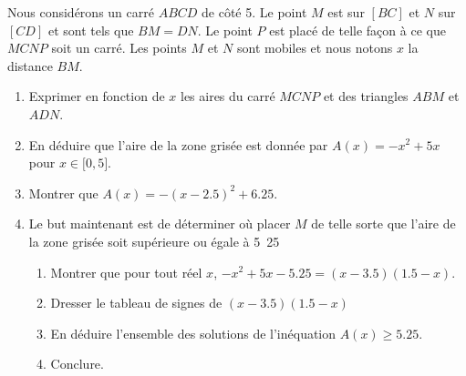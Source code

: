 
\begin{exercice}\label{exosmath-0654}

%   


    Nous considérons un carré \( ABCD\) de côté \unit{5}{\centi\meter}. Le point \( M\) est sur \( [BC]\) et \( N\) sur \( [CD]\) et sont tels que \( BM=DN\). Le point \( P\) est placé de telle façon à ce que \( MCNP\) soit un carré. Les points \( M\) et \( N\) sont mobiles et nous notons \( x\) la distance \( BM\).

    \begin{center}
   
    \end{center}

    \begin{enumerate}
        \item
            Exprimer en fonction de \( x\) les aires du carré \( MCNP\) et des triangles \( ABM\) et \( ADN\).
        \item
            En déduire que l'aire de la zone grisée est donnée par \( A(x)=-x^2+5x\) pour \( x\in\mathopen[ 0 , 5 \mathclose]\).
        \item
            Montrer que \( A(x)=-(x-2.5)^2+6.25\).
        \item
            Le but maintenant est de déterminer où placer \( M\) de telle sorte que l'aire de la zone grisée soit supérieure ou égale à \unit{5.25}{\centi\meter\squared}
            \begin{enumerate}
                \item
                    Montrer que pour tout réel \( x\), \( -x^2+5x-5.25=(x-3.5)(1.5-x)\).
                \item
                    Dresser le tableau de signes de \( (x-3.5)(1.5-x)\)
                \item
                    En déduire l'ensemble des solutions de l'inéquation \( A(x)\geq 5.25\).
                \item
                    Conclure.
            \end{enumerate}
    \end{enumerate}

\end{exercice}
